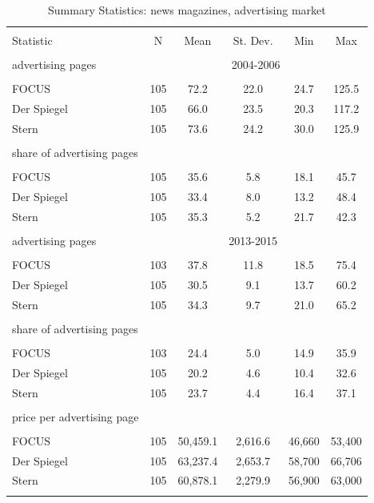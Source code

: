 \documentclass[12pt,a4paper,notitlepage]{article}
\begin{document}
\begin{table}[!htbp] \centering 
  \caption{Summary Statistics: news magazines, advertising market} 
	\label{tab_news2}
\begin{tabular}{@{\extracolsep{5pt}}lccccc} 
\\[-1.8ex]\hline 
\hline \\[-1.8ex] 
Statistic & \multicolumn{1}{c}{N} & \multicolumn{1}{c}{Mean} & \multicolumn{1}{c}{St. Dev.} & \multicolumn{1}{c}{Min} & \multicolumn{1}{c}{Max} \\ 
\hline \\[-1.8ex] 
advertising pages & \multicolumn{5}{c}{2004-2006}\\
\hline \\[-1.8ex] 
FOCUS & 105 & 72.2 & 22.0 & 24.7 & 125.5 \\ 
Der Spiegel & 105 & 66.0 & 23.5 & 20.3 & 117.2 \\ 
Stern & 105 & 73.6 & 24.2 & 30.0 & 125.9 \\ 
\hline \\[-1.8ex] 
share of advertising pages \\
\hline \\[-1.8ex] 
FOCUS & 105 & 35.6 & 5.8 & 18.1 & 45.7 \\ 
Der Spiegel & 105 & 33.4 & 8.0 & 13.2 & 48.4 \\ 
Stern & 105 & 35.3 & 5.2 & 21.7 & 42.3 \\ 
\hline \\[-1.8ex] 
advertising pages &&& 2013-2015 \\
\hline \\[-1.8ex] 
FOCUS & 103 & 37.8 & 11.8 & 18.5 & 75.4 \\ 
Der Spiegel & 105 & 30.5 & 9.1 & 13.7 & 60.2 \\ 
Stern & 105 & 34.3 & 9.7 & 21.0 & 65.2 \\ 
\hline \\[-1.8ex] 
share of advertising pages \\
\hline \\[-1.8ex] 
FOCUS & 103 & 24.4 & 5.0 & 14.9 & 35.9 \\ 
Der Spiegel & 105 & 20.2 & 4.6 & 10.4 & 32.6 \\ 
Stern & 105 & 23.7 & 4.4 & 16.4 & 37.1 \\
\hline \\[-1.8ex] 
price per advertising page \\
\hline \\[-1.8ex] 
FOCUS & 105 & 50,459.1 & 2,616.6 & 46,660 & 53,400 \\ 
Der Spiegel & 105 & 63,237.4 & 2,653.7 & 58,700 & 66,706 \\ 
Stern & 105 & 60,878.1 & 2,279.9 & 56,900 & 63,000 \\ 
\hline \\[-1.8ex] 
\end{tabular} 
\end{table} 
\end{document}
